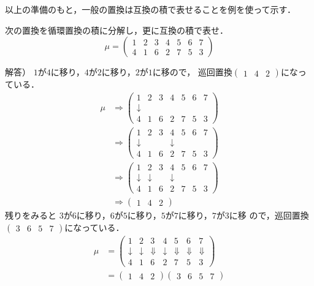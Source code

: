 以上の準備のもと，一般の置換は互換の積で表せることを例を使って示す．
\begin{exQ} 次の置換を循環置換の積に分解し，更に互換の積で表せ．
\[
     \mu=
     \begin{pmatrix}
          1&2&3&4&5&6&7\\
          4&1&6&2&7&5&3
     \end{pmatrix}
\]
\end{exQ}
解答）
$1$が$4$に移り，$4$が$2$に移り，$2$が$1$に移ので，
巡回置換$\begin{pmatrix}1&4&2\end{pmatrix}$になっている．
\[
\begin{split}
     \mu&\Rightarrow 
     \begin{pmatrix}
          1&2&3&4&5&6&7\\\downarrow&&&&&&\\
           4&1&6&2&7&5&3 
      \end{pmatrix}\\
     &\Rightarrow 
     \begin{pmatrix}
          1&2&3&4&5&6&7\\
          \downarrow&&&\downarrow&&&\\
           4&1&6&2&7&5&3 
      \end{pmatrix}\\
     &\Rightarrow 
     \begin{pmatrix}
          1&2&3&4&5&6&7\\
          \downarrow&\downarrow&&\downarrow&&&\\
           4&1&6&2&7&5&3 
      \end{pmatrix}\\
     &\Rightarrow \begin{pmatrix}1&4&2\end{pmatrix}
\end{split}
\]
残りをみると
$3$が$6$に移り，$6$が$5$に移り，$5$が$7$に移り，$7$が$3$に移
ので，巡回置換$\begin{pmatrix}3&6&5&7\end{pmatrix}$になっている．
\[
\begin{split}
     \mu&=\begin{pmatrix}1&2&3&4&5&6&7\\\downarrow&\downarrow&\Downarrow&\downarrow&\Downarrow&\Downarrow&\Downarrow\\
      4&1&6&2&7&5&3 \end{pmatrix}\\
     &=\begin{pmatrix}1&4&2\end{pmatrix}
     \begin{pmatrix}3&6&5&7\end{pmatrix}
\end{split}
\]
